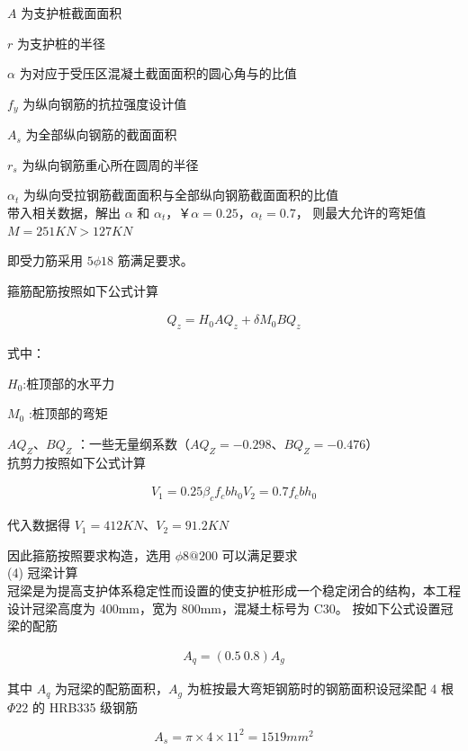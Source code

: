 $A$ 为支护桩截面面积

$r$ 为支护桩的半径

$\alpha $ 为对应于受压区混凝土截面面积的圆心角与的比值

$f_y$ 为纵向钢筋的抗拉强度设计值

$A_s$ 为全部纵向钢筋的截面面积

$r_s$ 为纵向钢筋重心所在圆周的半径

$\alpha_t$ 为纵向受拉钢筋截面面积与全部纵向钢筋截面面积的比值\\

带入相关数据，解出 $\alpha \text{ 和 } \alpha_t$，￥$\alpha=0.25$，$\alpha_t=0.7$，
则最大允许的弯矩值 $M=251 KN > 127 KN$

即受力筋采用 $5\phi 18$ 筋满足要求。

箍筋配筋按照如下公式计算

\begin{align}
    \label{fx:6.8}
    Q_z=H_0AQ_z+\delta M_0BQ_z
\end{align}

式中：

$H_0$:桩顶部的水平力

$M_0$ :桩顶部的弯矩

$AQ_Z$、$BQ_Z$ ：一些无量纲系数（$AQ_Z=-0.298$、$BQ_Z=-0.476$）\\

抗剪力按照如下公式计算

\begin{align}
    \label{fx:6.8}
    V_1=0.25 \beta_cf_cbh_0
    V_2=0.7 f_cbh_0
\end{align}

代入数据得 $V_1=412KN$、$V_2=91.2KN$

因此箍筋按照要求构造，选用 $\phi8@200$ 可以满足要求\\

(4) 冠梁计算\\

冠梁是为提高支护体系稳定性而设置的使支护桩形成一个稳定闭合的结构，本工程设计冠梁高度为 400mm，宽为 800mm，混凝土标号为 C30。
按如下公式设置冠梁的配筋

\begin{align}
    \label{fx:6.9}
    A_q=(0.5~0.8)A_g
\end{align}

其中 $A_q$ 为冠梁的配筋面积，$A_g$ 为桩按最大弯矩钢筋时的钢筋面积设冠梁配 4 根 $\Phi22$ 的 HRB335 级钢筋

\[A_s=\pi \times 4\times 11^2=1519 mm^2\]

